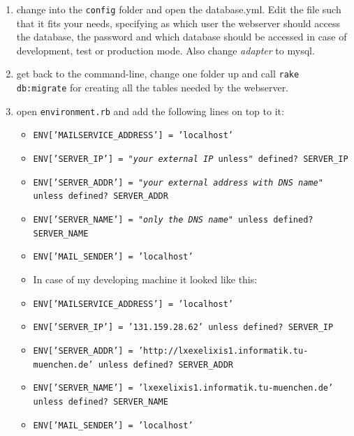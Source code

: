\documentclass{scrartcl}
\begin{document}
\begin{enumerate}
				\item change into the  \texttt{config} folder and open the database.yml. Edit the file such that it fits your needs, specifying as which user the webserver should access the database, the password and which database should be accessed in case of development, test or production mode.  Also change \textit{adapter} to mysql.
				\item get back to the command-line, change one folder up and call \texttt{rake db:migrate} for creating all the tables needed by the webserver.
				\item open \texttt{environment.rb} and add the following lines on top to it:
					\begin{itemize}
						\item[] \texttt{ENV['MAILSERVICE\_ADDRESS'] = 'localhost'}
						\item[] \texttt{ENV['SERVER\_IP'] = "\textit{your external IP} unless" defined? SERVER\_IP }
						\item[] \texttt{ENV['SERVER\_ADDR'] = "\textit{your external address with DNS name}" unless defined? SERVER\_ADDR}
						\item[] \texttt{ENV['SERVER\_NAME'] = "\textit{only the DNS name}" unless defined? SERVER\_NAME}
						\item[] \texttt{ENV['MAIL\_SENDER'] = 'localhost'}
						\item[] In case of my developing machine it looked like this:
						\item[] \texttt{ENV['MAILSERVICE\_ADDRESS'] = 'localhost'}
						\item[] \texttt{ENV['SERVER\_IP'] =  '131.159.28.62' unless defined? SERVER\_IP }
						\item[] \texttt{ENV['SERVER\_ADDR'] =  'http://lxexelixis1.informatik.tu-muenchen.de' unless defined? SERVER\_ADDR}
						\item[] \texttt{ENV['SERVER\_NAME'] =  'lxexelixis1.informatik.tu-muenchen.de' unless defined? SERVER\_NAME}
						\item[] \texttt{ENV['MAIL\_SENDER'] = 'localhost'}
					\end{itemize}
				\end{enumerate}
				
\end{document}
